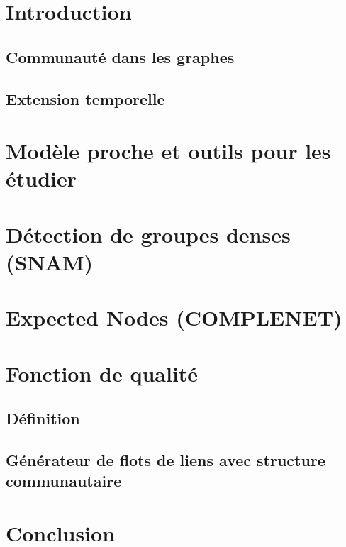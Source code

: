 \chapter{Introduction}
\section{Communauté dans les graphes}
\cite{Fortunato2010}
\section{Extension temporelle}



\chapter{Modèle proche et outils pour les étudier}




\chapter{Détection de groupes denses (SNAM)}

\chapter{Expected Nodes (COMPLENET)}

\chapter{Fonction de qualité}
\section{Définition}
\section{Générateur de flots de liens avec structure communautaire}

\chapter{Conclusion}
